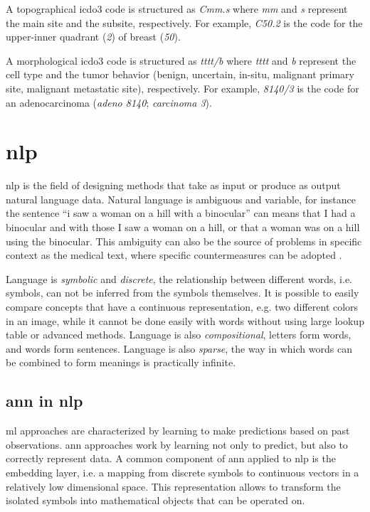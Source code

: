 A topographical \ac{icdo3} code is structured as \emph{Cmm.s} where
\emph{mm} and \emph{s} represent the main site and the subsite,
respectively. For example, \emph{C50.2}
is the code for the upper-inner quadrant (\emph{2}) of breast (\emph{50}).

A morphological \ac{icdo3} code is structured as \emph{tttt/b}
where \emph{tttt} and \emph{b} represent the cell type and the tumor
behavior (benign, uncertain, in-situ, malignant primary site,
malignant metastatic site), respectively. For example, \emph{8140/3}
is the code for an adenocarcinoma (\emph{adeno 8140};
\emph{carcinoma 3}).

\section{\ac{nlp}}
\ac{nlp} is the field of designing methods that take as input or
produce as output natural language data. Natural language is
ambiguous and variable, for instance the sentence ``i saw a woman on a
hill with a binocular'' can means that I had a binocular and with
those I saw a
woman on a hill, or that a woman was on a hill using the
binocular. This ambiguity can also be the source of problems in
specific context as the medical text, where specific countermeasures
can be adopted \cite{zhao_clinical_2019,codish2005model}.

Language is
\emph{symbolic} and \emph{discrete}, the relationship between different words,
i.e. symbols, can not be inferred from the symbols
themselves. It is possible to easily compare concepts that have a
continuous representation, e.g. two different colors in an image,
while it cannot be done easily with words without using large lookup
table or advanced methods. Language is also \emph{compositional},
letters form words, and words form sentences. Language is also
\emph{sparse}, the way in which words can be combined to form meanings
is practically infinite.

\subsection{\ac{ann} in \ac{nlp}}
\ac{ml} approaches are characterized by learning to make predictions
based on past observations. \ac{ann} approaches work by learning not
only to predict, but also to correctly represent data. A common
component of \ac{ann} applied to \ac{nlp} is the embedding layer,
i.e. a mapping from discrete symbols to continuous vectors in a
relatively low dimensional space. This representation allows to
transform the isolated symbols into mathematical objects that can be
operated on.

